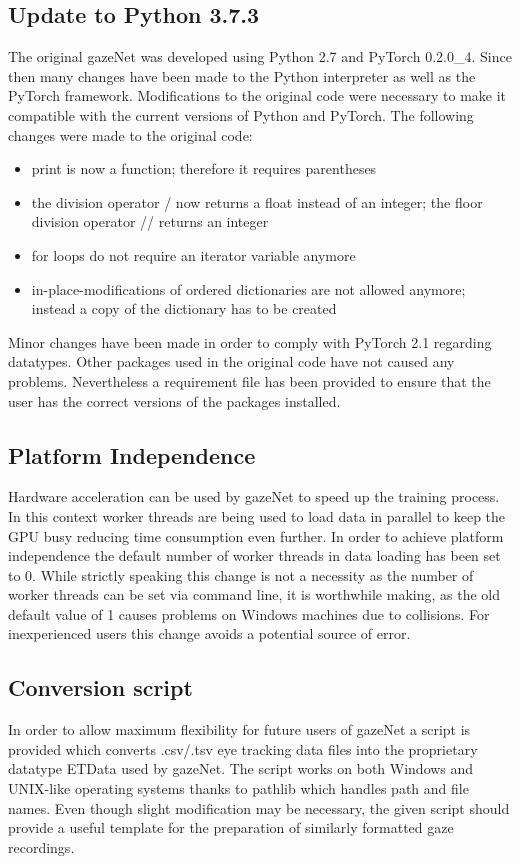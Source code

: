 \documentclass[conference]{IEEEtran}
\begin{document}
\subsection{Update to Python 3.7.3}
The original gazeNet was developed using Python 2.7 and PyTorch 0.2.0\_4. Since then many changes have been made to the Python interpreter as well as the PyTorch framework. Modifications to the original code were necessary to make it compatible with the current versions of Python and PyTorch. The following changes were made to the original code:
\begin{itemize}
    \item print is now a function; therefore it requires parentheses
    \item the division operator / now returns a float instead of an integer; the floor division operator // returns an integer
    \item for loops do not require an iterator variable anymore
    \item in-place-modifications of ordered dictionaries are not allowed anymore; instead a copy of the dictionary has to be created
\end{itemize}
Minor changes have been made in order to comply with PyTorch 2.1 regarding datatypes. Other packages used in the original code have not caused any problems. Nevertheless a requirement file has been provided to ensure that the user has the correct versions of the packages installed.

\subsection{Platform Independence}
Hardware acceleration can be used by gazeNet to speed up the training process. In this context worker threads are being used to load data in parallel to keep the GPU busy reducing time consumption even further. In order to achieve platform independence the default number of worker threads in data loading has been set to 0. While strictly speaking this change is not a necessity as the number of worker threads can be set via command line, it is worthwhile making, as the old default value of 1 causes problems on Windows machines due to collisions. For inexperienced users this change avoids a potential source of error.
\subsection{Conversion script}
In order to allow maximum flexibility for future users of gazeNet a script is provided which converts .csv/.tsv eye tracking data files into the proprietary datatype ETData used by gazeNet. The script works on both Windows and UNIX-like operating systems thanks to pathlib which handles path and file names. Even though slight modification may be necessary, the given script should provide a useful template for the preparation of similarly formatted gaze recordings.
\end{document}
